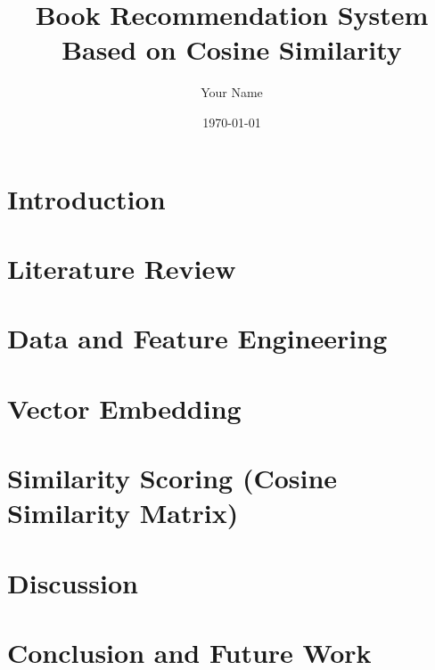 \documentclass[12pt]{article}
\title{Book Recommendation System Based on Cosine Similarity}
\author{Your Name}
\date{\today}
\begin{document}
	
	\maketitle
	
	\begin{abstract}
		
	\end{abstract}
	
	\tableofcontents
	\newpage
	
	\section{Introduction}
	
	
	\section{Literature Review}
	
	
	\section{Data and Feature Engineering}
	
	
	\section{Vector Embedding}
	
	
	\section{Similarity Scoring (Cosine Similarity Matrix)}
	
	
	\section{Discussion}
	
	
	\section{Conclusion and Future Work}
	
	
	
	
	
\end{document}
